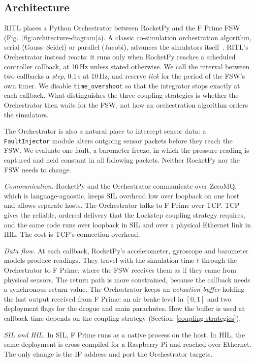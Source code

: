 \subsection{Architecture}\label{framework-arch}
RITL places a Python Orchestrator between RocketPy and the F Prime FSW (Fig.~\ref{fig:architecture-diagram}a). A classic co-simulation orchestration algorithm, serial (Gauss--Seidel) or parallel (Jacobi), advances the simulators itself~\cite{gomes2017cosimulation}. RITL's Orchestrator instead reacts: it runs only when RocketPy reaches a scheduled controller callback, at 10\,Hz unless stated otherwise. We call the interval between two callbacks a \emph{step}, 0.1\,s at 10\,Hz, and reserve \emph{tick} for the period of the FSW's own timer. We disable \texttt{time\_overshoot} so that the integrator stops exactly at each callback. What distinguishes the three coupling strategies is whether the Orchestrator then waits for the FSW, not how an orchestration algorithm orders the simulators.

The Orchestrator is also a natural place to intercept sensor data: a \texttt{FaultInjector} module alters outgoing sensor packets before they reach the FSW. We evaluate one fault, a barometer freeze, in which the pressure reading is captured and held constant in all following packets. Neither RocketPy nor the FSW needs to change.

\emph{Communication.} RocketPy and the Orchestrator communicate over ZeroMQ, which is language-agnostic, keeps SIL overhead low over loopback on one host and allows separate hosts. The Orchestrator talks to F Prime over TCP. TCP gives the reliable, ordered delivery that the Lockstep coupling strategy requires, and the same code runs over loopback in SIL and over a physical Ethernet link in HIL. The cost is TCP's connection overhead.

\emph{Data flow.} At each callback, RocketPy's accelerometer, gyroscope and barometer models produce readings. They travel with the simulation time $t$ through the Orchestrator to F Prime, where the FSW receives them as if they came from physical sensors. The return path is more constrained, because the callback needs a synchronous return value. The Orchestrator keeps an \emph{actuation buffer} holding the last output received from F Prime: an air brake level in $[0,1]$ and two deployment flags for the drogue and main parachutes. How the buffer is used at callback time depends on the coupling strategy (Section~\ref{coupling-strategies}).

\emph{SIL and HIL.} In SIL, F Prime runs as a native process on the host. In HIL, the same deployment is cross-compiled for a Raspberry Pi and reached over Ethernet. The only change is the IP address and port the Orchestrator targets.

